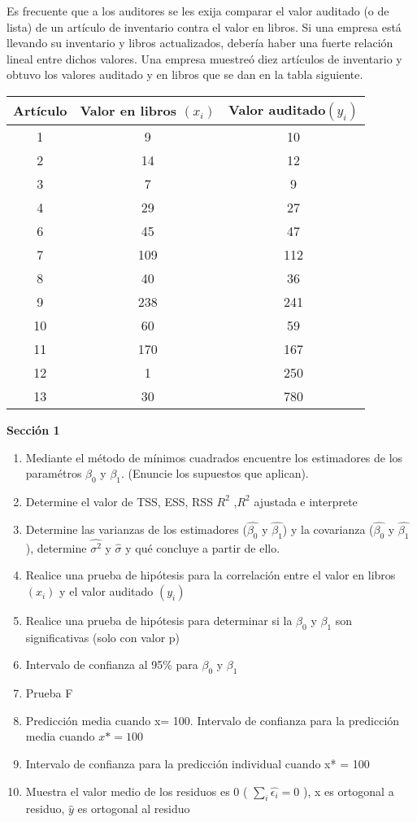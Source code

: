 \documentclass{../oxmathproblems}
\begin{document}
\begin{questions}

\miquestion Es frecuente que a los auditores se les exija comparar el valor auditado (o de lista) de un artículo de inventario contra el valor en libros. Si una empresa está llevando su inventario y libros actualizados, debería haber una fuerte relación lineal entre dichos valores. Una empresa muestreó diez artículos de inventario y obtuvo los valores auditado y en libros que se dan en la tabla siguiente. 

\begin{tabular}{|c|c|c|}
\hline
Artículo & Valor en libros $(x_i)$ & Valor auditado$(y_i)$ \\ \hline
1 & 9 & 10\\
2 & 14 & 12\\
3 & 7 & 9\\ 
4 & 29  & 27\\ 
6 & 45 & 47\\ 
7 & 109 & 112\\ 
8 & 40 & 36\\ 
9 & 238 & 241\\ 
10 & 60 & 59\\
11 & 170 & 167\\
12 & 1 & 250\\
13 & 30 & 780\\
\hline
\end{tabular}


\textbf {Sección 1} 

\begin{enumerate}
  \item Mediante el método de mínimos cuadrados encuentre los estimadores de los paramétros $\beta_0$ y $\beta_1$. (Enuncie los supuestos que aplican). 
  \item Determine el valor de TSS, ESS, RSS  $R^2$ ,$R^2$ ajustada   e interprete 
  \item Determine las varianzas de los estimadores ($\hat{\beta_0}$ y $\hat{\beta_1}$) y la covarianza  ($\hat{\beta_0}$ y $\hat{\beta_1}$), determine $\hat{\sigma^2}$ y $\hat{\sigma}$ y qué concluye a partir de ello.
  \item Realice una prueba de hipótesis para la correlación entre el valor en libros $(x_i)$ y el valor auditado $(y_i)$
  \item Realice una prueba de hipótesis para determinar si la  $\beta_0$ y $\beta_1$ son significativas (solo con valor p) 
  \item Intervalo de confianza al 95\% para $\beta_0$ y $\beta_1$ 
   \item Prueba F 
   \item Predicción media cuando x= 100. Intervalo de confianza para la predicción media cuando $x* = 100$
   \item Intervalo de confianza para la predicción individual cuando x* = 100
   \item Muestra el valor medio de los residuos es 0 ( $\sum_{i}\hat{\epsilon_i}=0$ ), x es ortogonal a residuo, $\hat{y}$  es ortogonal al residuo
\end{enumerate}



\end{questions}
\end{document}
